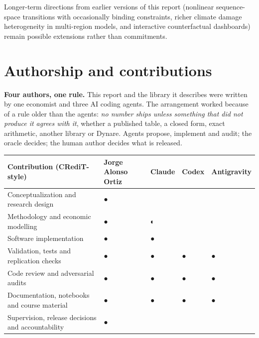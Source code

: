 \documentclass[11pt,letterpaper]{article}
\newcounter{none} %
\renewcommand{\_}{\pmunderscore\allowbreak}
\begin{document}
Longer-term directions from earlier versions of this report (nonlinear sequence-space transitions with occasionally binding constraints, richer climate damage heterogeneity in multi-region models, and interactive counterfactual dashboards) remain possible extensions rather than commitments.

\section*{Authorship and contributions}\label{authorship-and-contributions}

\textbf{Four authors, one rule.} This report and the library it describes were written by one economist and three AI coding agents. The arrangement worked because of a rule older than the agents: \emph{no number ships unless something that did not produce it agrees with it}, whether a published table, a closed form, exact arithmetic, another library or Dynare. Agents propose, implement and audit; the oracle decides; the human author decides what is released.

{\def\LTcaptype{none} %
\begin{longtable}[]{@{}
  >{\raggedright\arraybackslash}p{}
  >{\centering\arraybackslash}p{}
  >{\centering\arraybackslash}p{}
  >{\centering\arraybackslash}p{}
  >{\centering\arraybackslash}p{}@{}}
\toprule\noalign{}
\begin{minipage}[b]{\linewidth}\raggedright
Contribution (CRediT-style)
\end{minipage} & \begin{minipage}[b]{\linewidth}\centering
Jorge Alonso Ortiz
\end{minipage} & \begin{minipage}[b]{\linewidth}\centering
Claude
\end{minipage} & \begin{minipage}[b]{\linewidth}\centering
Codex
\end{minipage} & \begin{minipage}[b]{\linewidth}\centering
Antigravity
\end{minipage} \\
\midrule\noalign{}
\endhead
\bottomrule\noalign{}
\endlastfoot
Conceptualization and research design & ● & & & \\
Methodology and economic modelling & ● & ◐ & & \\
Software implementation & ● & ● & & \\
Validation, tests and replication checks & ● & ● & ● & ● \\
Code review and adversarial audits & ● & ● & ● & ● \\
Documentation, notebooks and course material & ● & ● & ● & ● \\
Supervision, release decisions and accountability & ● & & & \\
\end{longtable}
}
\end{document}
